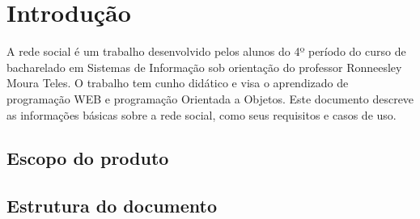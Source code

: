 \chapter{Introdução}

A rede social é um trabalho desenvolvido pelos alunos do 4º período do curso de bacharelado em Sistemas de Informação sob orientação do professor Ronneesley Moura Teles.
O trabalho tem cunho didático e visa o aprendizado de programação WEB e programação Orientada a Objetos.
Este documento descreve as informações básicas sobre a rede social, como seus requisitos e casos de uso.


\section{Escopo do produto}

  

\section{Estrutura do documento}

